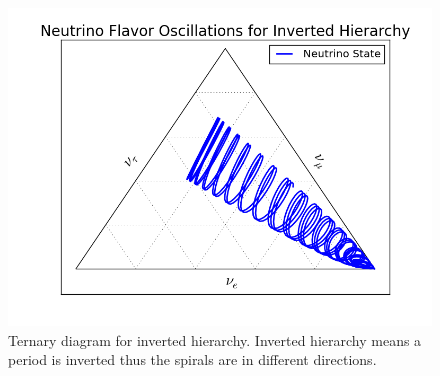 \documentclass[letterpaper,12pt,english]{sphinxmanual}
\begin{document}
\begin{figure}[htbp]
\centering
\capstart

\includegraphics{Inv-1000-1.png}
\caption{Ternary diagram for inverted hierarchy. Inverted hierarchy means a period is inverted thus the spirals are in different directions.}\end{figure}
\end{document}
